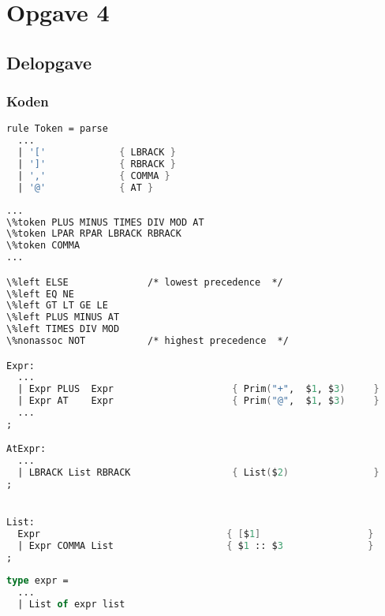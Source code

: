 \section{Opgave 4}
\subsection{Delopgave }\label{ass:4-1}
\subsubsection{Koden}
\begin{lstlisting}[language=fsharp]
rule Token = parse
  ...
  | '['             { LBRACK }
  | ']'             { RBRACK }
  | ','             { COMMA }
  | '@'             { AT }
\end{lstlisting}

\begin{lstlisting}[language=fsharp]
...
\%token PLUS MINUS TIMES DIV MOD AT
\%token LPAR RPAR LBRACK RBRACK
\%token COMMA
...

\%left ELSE              /* lowest precedence  */
\%left EQ NE 
\%left GT LT GE LE
\%left PLUS MINUS AT
\%left TIMES DIV MOD 
\%nonassoc NOT           /* highest precedence  */

Expr:
  ...
  | Expr PLUS  Expr                     { Prim("+",  $1, $3)     }
  | Expr AT    Expr                     { Prim("@",  $1, $3)     }
  ...
;

AtExpr:
  ...
  | LBRACK List RBRACK                  { List($2)               }
;


List:
  Expr                                 { [$1]                   }
  | Expr COMMA List                    { $1 :: $3               }
;
\end{lstlisting}

\begin{lstlisting}[language=fsharp]
type expr = 
  ...
  | List of expr list
\end{lstlisting}

